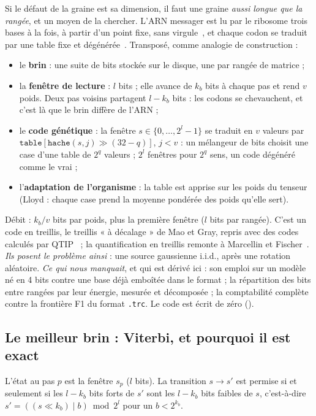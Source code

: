 Si le défaut de la graine est sa dimension, il faut une graine \emph{aussi longue que la rangée}, et un moyen de la chercher. L'ARN messager est lu par le ribosome trois bases à la fois, à partir d'un point fixe, sans virgule~\cite{genome-crick1961}, et chaque codon se traduit par une table fixe et dégénérée~\cite{genome-crick1968}. Transposé, comme analogie de construction :
\begin{itemize}
\item le \textbf{brin} : une suite de bits stockée sur le disque, une par rangée de matrice ;
\item la \textbf{fenêtre de lecture} : $l$ bits ; elle avance de $k_b$ bits à chaque pas et rend $v$ poids. Deux pas voisins partagent $l - k_b$ bits : les codons se chevauchent, et c'est là que le brin diffère de l'ARN ;
\item le \textbf{code génétique} : la fenêtre $s \in \{0, \ldots, 2^l - 1\}$ se traduit en $v$ valeurs par $\texttt{table}[\texttt{hache}(s, j) \gg (32 - q)]$, $j < v$ : un mélangeur de bits choisit une case d'une table de $2^q$ valeurs ; $2^l$ fenêtres pour $2^q$ sens, un code dégénéré comme le vrai ;
\item l'\textbf{adaptation de l'organisme} : la table est apprise sur les poids du tenseur (Lloyd : chaque case prend la moyenne pondérée des poids qu'elle sert).
\end{itemize}
Débit : $k_b / v$ bits par poids, plus la première fenêtre ($l$ bits par rangée). C'est un code en treillis, le treillis « à décalage » de Mao et Gray, repris avec des codes calculés par QTIP~\cite{genome-mao2010,genome-qtip} ; la quantification en treillis remonte à Marcellin et Fischer~\cite{marcellin1990,genome-fischer1991}. \emph{Ils posent le problème ainsi} : une source gaussienne i.i.d., après une rotation aléatoire. \emph{Ce qui nous manquait}, et qui est dérivé ici : son emploi sur un modèle né en 4 bits contre une base déjà emboîtée dans le format ; la répartition des bits entre rangées par leur énergie, mesurée et décomposée ; la comptabilité complète contre la frontière F1 du format \texttt{.trc}. Le code est écrit de zéro ().

\subsection{Le meilleur brin : Viterbi, et pourquoi il est exact}

L'état au pas $p$ est la fenêtre $s_p$ ($l$ bits). La transition $s \to s'$ est permise si et seulement si les $l - k_b$ bits forts de $s'$ sont les $l - k_b$ bits faibles de $s$, c'est-à-dire $s' = ((s \ll k_b) \mid b) \bmod 2^l$ pour un $b < 2^{k_b}$.

